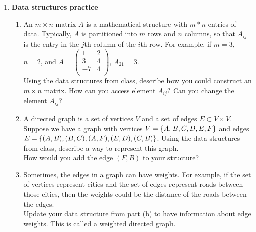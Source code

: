 \documentclass{article}
\begin{document}
\pagestyle{fancy}
\begin{enumerate}

\item \textbf{Data structures practice} \\
\begin{enumerate}
\item An $m \times n$ matrix $A$ is a mathematical structure with $m * n$ entries of data.  Typically, $A$ is partitioned into $m$ rows and $n$ columns, so that $A_{ij}$ is the entry in the $j$th column of the $i$th row.  For example, if $m = 3$, $n = 2$, and $A = \begin{pmatrix} 1 & 2 \\ 3 & 4 \\ -7 & 4 \\ \end{pmatrix}$, $A_{21} = 3$. \\

Using the data structures from class, describe how you could construct an $m \times n$ matrix.  How can you access element $A_{ij}$?  Can you change the element $A_{ij}$?
\end{enumerate}

\begin{enumerate}
\setcounter{enumii}{1}
\item A directed graph is a set of vertices $V$ and a set of edges $E \subset V \times V$.  Suppose we have a graph with vertices $V = \{A, B, C, D, E, F\}$ and edges $E = \{(A, B), (B, C), (A, F), (E, D), (C, B)\}$.  Using the data structures from class, describe a way to represent this graph. \\

How would you add the edge $(F, B)$ to your structure?
\end{enumerate}

\begin{enumerate}
\setcounter{enumii}{2}
\item Sometimes, the edges in a graph can have weights.  For example, if the set of vertices represent cities and the set of edges represent roads between those cities, then the weights could be the distance of the roads between the edges. \\

Update your data structure from part (b) to have information about edge weights.  This is called a weighted directed graph.
\end{enumerate}


\end{enumerate}
\end{document}
